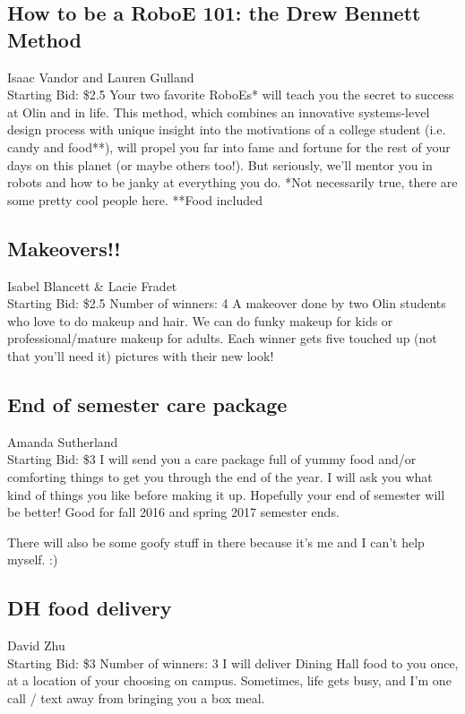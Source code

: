 \documentclass[11pt]{article}
\begin{document}
\subsection{How to be a RoboE 101: the Drew Bennett Method}
Isaac Vandor and Lauren Gulland
\\
Starting Bid: \$2.5
\newline
Your two favorite RoboEs* will teach you the secret to success at Olin and in life. This method, which combines an innovative systems-level design process with unique insight into the motivations of a college student (i.e. candy and food**), will propel you far into fame and fortune for the rest of your days on this planet (or maybe others too!). But seriously, we'll mentor you in robots and how to be janky at everything you do.       *Not necessarily true, there are some pretty cool people here.  **Food included
\subsection{Makeovers!!}
Isabel Blancett \& Lacie Fradet
\\
Starting Bid: \$2.5
\newline
Number of winners: 4
\newline
A makeover done by two Olin students who love to do makeup and hair.  We can do funky makeup for kids or professional/mature makeup for adults.  Each winner gets five touched up (not that you'll need it) pictures with their new look!
\subsection{End of semester care package}
Amanda Sutherland
\\
Starting Bid: \$3
\newline
I will send you a care package full of yummy food and/or comforting things to get you through the end of the year. I will ask you what kind of things you like before making it up. Hopefully your end of semester will be better! Good for fall 2016 and spring 2017 semester ends. 

There will also be some goofy stuff in there because it's me and I can't help myself. :)
\subsection{DH food delivery }
David Zhu
\\
Starting Bid: \$3
\newline
Number of winners: 3
\newline
I will deliver Dining Hall food to you once, at a location of your choosing on campus. Sometimes, life gets busy, and I'm one call / text away from bringing you a box meal.
\end{document}
